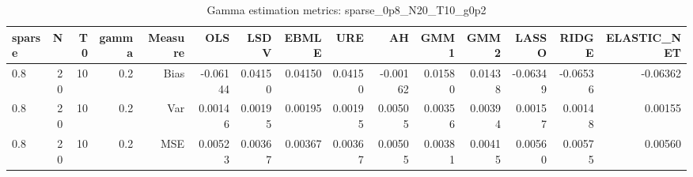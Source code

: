\begin{table}[!htbp]\centering
\caption{Gamma estimation metrics: sparse_0p8_N20_T10_g0p2}
\label{tab:table1_sparse_0p8_N20_T10_g0p2}
\begin{tabular}{lrrrrrrrrrrrrrr}
\hline
sparse & N & T0 & gamma & Measure & OLS & LSDV & EBMLE & URE & AH & GMM1 & GMM2 & LASSO & RIDGE & ELASTIC_NET \\
\hline
0.8 & 20 & 10 & 0.2 & Bias & -0.06144 & 0.04150 & 0.04150 & 0.04150 & -0.00162 & 0.01580 & 0.01438 & -0.06349 & -0.06536 & -0.06362 \\
0.8 & 20 & 10 & 0.2 & Var & 0.00146 & 0.00195 & 0.00195 & 0.00195 & 0.00505 & 0.00356 & 0.00394 & 0.00157 & 0.00148 & 0.00155 \\
0.8 & 20 & 10 & 0.2 & MSE & 0.00523 & 0.00367 & 0.00367 & 0.00367 & 0.00505 & 0.00381 & 0.00415 & 0.00560 & 0.00575 & 0.00560 \\
\hline
\end{tabular}
\end{table}

